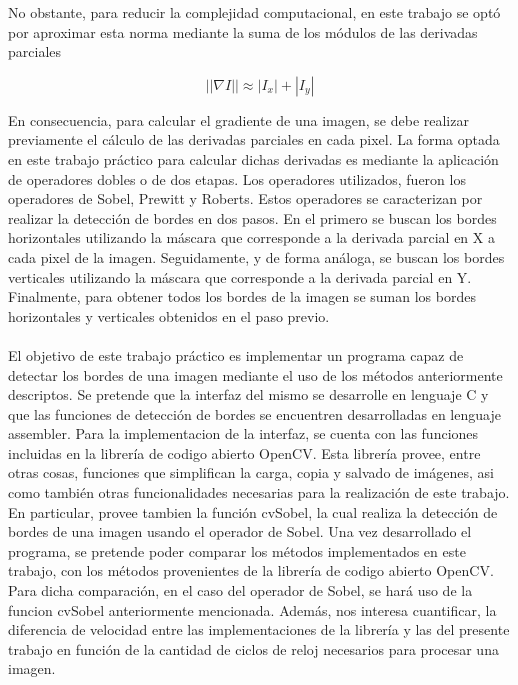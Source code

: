 \documentclass[11pt, a4paper]{article}
\begin{document}
No obstante, para reducir la complejidad computacional, en este trabajo se opt\'o por aproximar esta norma mediante la suma de los m\'odulos de las derivadas parciales

\begin{equation}
||\nabla I|| \approx |I_x| + |I_y|
\end{equation}


En consecuencia, para calcular el gradiente de una imagen, se debe realizar previamente el c\'alculo de las derivadas parciales en cada pixel.
La forma optada en este trabajo pr\'actico para calcular dichas derivadas es mediante la aplicaci\'on de operadores dobles o de dos etapas. Los operadores utilizados, fueron los operadores de Sobel, Prewitt y Roberts. Estos operadores se caracterizan por realizar la detecci\'on de bordes en dos pasos. En el primero se buscan los bordes horizontales utilizando la m\'ascara que corresponde a la derivada parcial en X a cada pixel de la imagen. Seguidamente, y de forma an\'aloga, se buscan los bordes verticales utilizando la m\'ascara que corresponde a la derivada parcial en Y. Finalmente, para obtener todos los bordes de la imagen se suman los bordes horizontales y verticales obtenidos en el paso previo.


\paragraph{}
El objetivo de este trabajo pr\'actico es implementar un programa capaz de detectar los bordes de una imagen mediante el uso de los m\'etodos anteriormente descriptos. Se pretende que la interfaz del mismo se desarrolle en lenguaje C y que las funciones de detecci\'on de bordes se encuentren desarrolladas en lenguaje assembler.
Para la implementacion de la interfaz, se cuenta con las funciones incluidas en la librer\'ia de codigo abierto OpenCV. Esta librer\'ia provee, entre otras cosas, funciones que simplifican la carga, copia y salvado de im\'agenes, asi como tambi\'en otras funcionalidades necesarias para la realizaci\'on de este trabajo. En particular, provee tambien la funci\'on cvSobel, la cual realiza la detecci\'on de bordes de una imagen usando el operador de Sobel.
Una vez desarrollado el programa, se pretende poder comparar los m\'etodos implementados en este trabajo, con los m\'etodos provenientes de la librer\'ia de codigo abierto OpenCV. Para dicha comparaci\'on, en el caso del operador de Sobel, se har\'a uso de la funcion cvSobel anteriormente mencionada. Adem\'as, nos interesa cuantificar, la diferencia de velocidad entre las implementaciones de la librer\'ia y las del presente trabajo en funci\'on de la cantidad de ciclos de reloj necesarios para procesar una imagen.
\end{document}
